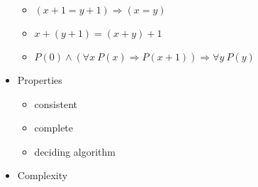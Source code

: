 \begin{frame}
\begin{itemize}
\begin{itemize}
\item $(x + 1 = y + 1) \Rightarrow (x = y)$

\item $x + (y + 1) = (x + y) + 1$

\item $P(0) \wedge (\forall x~P(x) \Rightarrow P(x + 1)) \Rightarrow \forall y~P(y)$

\end{itemize}

\item<3-> Properties

\begin{itemize}

\item consistent

\item complete

\item deciding algorithm

\end{itemize}

\item<4-> Complexity

\begin{itemize}


\end{itemize}
\end{itemize}
\end{frame}
